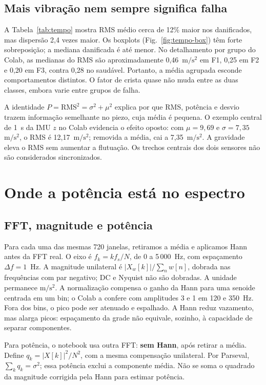 \documentclass[conference,a4paper]{IEEEtran}
\newcommand{\U}{\mathrm{m}/\mathrm{s}^{2}}
\begin{document}
\subsection{Mais vibração nem sempre significa falha}
A Tabela~\ref{tab:tempo} mostra RMS médio cerca de 12\% maior nos danificados, mas dispersão 2,4 vezes maior. Os boxplots (Fig.~\ref{fig:tempo-box}) têm forte sobreposição; a mediana danificada é até menor. No detalhamento por grupo do Colab, as medianas do RMS são aproximadamente 0,46~$\U$ em F1, 0,25 em F2 e 0,20 em F3, contra 0,28 no saudável. Portanto, a média agrupada esconde comportamentos distintos. O fator de crista quase não muda entre as duas classes, embora varie entre grupos de falha.

A identidade $P=\mathrm{RMS}^2=\sigma^2+\mu^2$ explica por que RMS, potência e desvio trazem informação semelhante no piezo, cuja média é pequena. O exemplo central de 1~s da IMU $z$ no Colab evidencia o efeito oposto: com $\mu=9,69$ e $\sigma=7,35$~$\U$, o RMS é 12,17~$\U$; removida a média, cai a 7,35~$\U$. A gravidade eleva o RMS sem aumentar a flutuação. Os trechos centrais dos dois sensores não são considerados sincronizados.

\clearpage
\section{Onde a potência está no espectro}
\subsection{FFT, magnitude e potência}
Para cada uma das mesmas 720 janelas, retiramos a média e aplicamos Hann antes da FFT real. O eixo é $f_k=kf_s/N$, de 0 a 5\,000~Hz, com espaçamento $\Delta f=1$~Hz. A magnitude unilateral é $|X_w[k]|/\sum_n w[n]$, dobrada nas frequências com par negativo; DC e Nyquist não são dobradas. A unidade permanece $\U$. A normalização compensa o ganho da Hann para uma senoide centrada em um bin; o Colab a confere com amplitudes 3 e 1 em 120 e 350~Hz. Fora dos bins, o pico pode ser atenuado e espalhado. A Hann reduz vazamento, mas alarga picos: espaçamento da grade não equivale, sozinho, à capacidade de separar componentes.

Para potência, o notebook usa outra FFT: \textbf{sem Hann}, após retirar a média. Define $q_k=|X[k]|^2/N^2$, com a mesma compensação unilateral. Por Parseval, $\sum_k q_k=\sigma^2$; essa potência exclui a componente média. Não se soma o quadrado da magnitude corrigida pela Hann para estimar potência.
\end{document}
